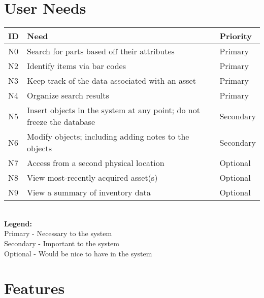 \documentclass{article}
\begin{document}
\section{User Needs}
\begin{tabular}{ | p{0.15in} | p{4.0in} | p{.75in} |}
\hline
\textbf{ID} & \textbf{Need} & \textbf{Priority} \\
\hline
\hline
N0 & Search for parts based off their attributes & Primary \\
\hline
N2 & Identify items via bar codes & Primary \\
\hline
N3 & Keep track of the data associated with an asset & Primary \\
\hline
N4 & Organize search results & Primary \\
\hline
N5 & Insert objects in the system at any point; do not freeze the database & Secondary \\
\hline
N6 & Modify objects; including adding notes to the objects & Secondary \\
\hline
N7 & Access from a second physical location & Optional \\
\hline
N8 & View most-recently acquired asset(s) & Optional \\
\hline
N9 & View a summary of inventory data & Optional \\
\hline
\end{tabular} \\
\textbf{Legend:} \\
Primary - Necessary to the system \\
Secondary - Important to the system \\
Optional - Would be nice to have in the system
\section{Features}
\end{document}
